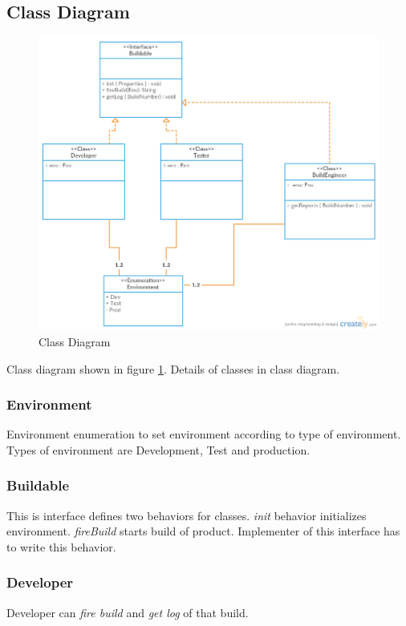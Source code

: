\documentclass[a4paper,oneside,1,english1pt]{report}
\begin{document}
\subsection{Class Diagram}
\begin{figure}[h]
	\includegraphics[width=\linewidth]{diagrams/ClassDiagram2.png}
	\caption{Class Diagram}
	\label{fig:class_diagram}
\end{figure}
	Class diagram shown in figure \ref{fig:class_diagram}.
	Details of classes in class diagram.
		
	\subsubsection{Environment}
	Environment enumeration to set environment according to type of environment. Types of environment are Development, Test and production.
	
	\subsubsection{Buildable}
	This is interface defines two behaviors for classes. \textit{init} behavior initializes environment. \textit{fireBuild} starts build of product. Implementer of this interface has to write this behavior.
		
	\subsubsection{Developer}
	Developer can \textit{fire build} and \textit{get log} of that build.
		
\end{document}
